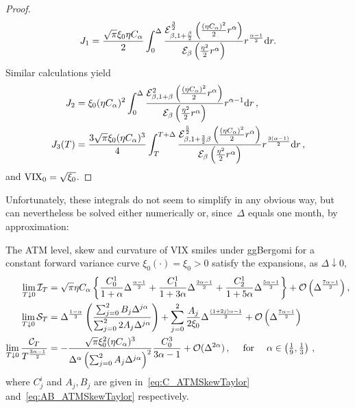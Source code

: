 \begin{proof}
\begin{equation}
    J_1 = \frac{\sqrt{\pi}\xi_0 \eta C_{\alpha}}2 \int_0^{\Delta} \frac{\mathcal{E}_{\beta, 1 + \frac\beta2}^{\frac32} \left(\frac{(\eta C_{\alpha})^2}2 r^\alpha\right)}{\mathcal{E}_{\beta}\left(\frac{\eta^2}2 r^\alpha\right)} r^{\frac{\alpha-1}2} \mathrm{d} r.
\end{equation}
Similar calculations yield
\begin{align*}
    J_2 &= \xi_0 (\eta C_\alpha)^2 \int_0^\Delta \frac{\mathcal{E}_{\beta, 1 + \beta}^{2} \left(\frac{(\eta C_{\alpha})^2}2 r^\alpha\right)}{\mathcal{E}_{\beta}\left(\frac{\eta^2}2 r^\alpha\right)} r^{\alpha-1} \mathrm{d} r\,, \\
    J_3(T) &= \frac{3\sqrt{\pi}\xi_0 (\eta C_\alpha)^3}4 \int_T^{T+\Delta} \frac{\mathcal{E}_{\beta, 1 + \frac32\beta}^{\frac52} \left(\frac{(\eta C_{\alpha})^2}2 r^\alpha\right)}{\mathcal{E}_{\beta}\left(\frac{\eta^2}2 r^\alpha\right)} r^{\frac{3(\alpha-1)}2} \mathrm{d} r\,,
\end{align*}
and
$\mathrm{VIX}_0 = \sqrt{\xi_0}$.
\end{proof}
Unfortunately, these integrals do not seem to simplify in any obvious way, 
but can nevertheless be solved either numerically or, since~$\Delta$ equals one month, by approximation:
\begin{corollary}\label{cor:ATMSkewTaylor}
The ATM level, skew and curvature of VIX smiles under ggBergomi for a constant forward variance curve $\xi_0(\cdot)=\xi_0>0$ satisfy the expansions,
as $\Delta\downarrow 0$,
\begin{equation}
\begin{aligned}
    \lim_{T\downarrow 0}\mathcal{I}_T &= \sqrt{\pi} \eta C_{\alpha} \left\{ \frac{C_0^1}{1+\alpha} 
 \Delta^{\frac{\alpha-1}{2}} + \frac{C_1^1}{1+3\alpha} 
 \Delta^{\frac{3\alpha-1}{2}}  + \frac{C_2^1}{1+5\alpha} 
 \Delta^{\frac{5\alpha-1}{2}}\right\} + \mathcal{O}\left(\Delta^{\frac{7\alpha - 1}2}\right), \\
 \lim_{T\downarrow 0}\mathcal{S}_T &= \Delta^{\frac{1-\alpha}2} \left(\frac{\sum_{j=0}^2 B_j \Delta^{j\alpha}}{\sum_{j=0}^2 2A_j \Delta^{j\alpha}}\right) + \sum_{j=0}^2 \frac{A_j}{2\xi_0} \Delta^{\frac{(1+2j)\alpha-1}{2}} + \mathcal{O}\left(\Delta^{\frac{7\alpha - 1}{2}}\right) \\
\lim_{T\downarrow 0}\frac{\mathcal{C}_T}{T^{\frac{3\alpha-1}{2}}} &= - \frac{\sqrt{\pi}\xi_0^2(\eta C_{\alpha})^3}{\Delta^{\alpha}\left(\sum_{j=0}^2 A_j \Delta^{j\alpha}\right)^2} \frac{C_0^3}{3\alpha-1} + \mathcal{O}(\Delta^{2\alpha})\,, \quad \textup{ for } \quad \textstyle \alpha\in\left(\frac19, \frac13\right)\,,
\end{aligned}
\end{equation}
where $C^i_j$ and $A_j, B_j$ are given in~\eqref{eq:C_ATMSkewTaylor} and~\eqref{eq:AB_ATMSkewTaylor} respectively.
\end{corollary}
